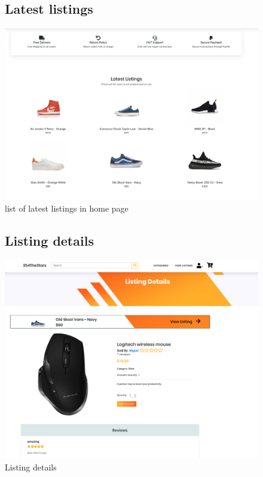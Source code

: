 \documentclass[11pt]{article}
\begin{document}
\begin{figure}[ht!]
    \subsection{Latest listings}
    \centering
    \includegraphics[width=\textwidth,height=0.3\paperheight,keepaspectratio]{Diagrams/External_Interfaces/Latest_Listings.png}
    \caption{list of latest listings in home page}
    \label{fig: List of listings}
\end{figure}
\FloatBarrier

\begin{figure}[ht!]
    \subsection{Listing details}
    \centering
    \includegraphics[width=\textwidth,height=0.3\paperheight,keepaspectratio]{Diagrams/External_Interfaces/Listing_details.png}
    \caption{Listing details}
    \label{fig: Latest listings}
\end{figure}
\FloatBarrier
\end{document}
